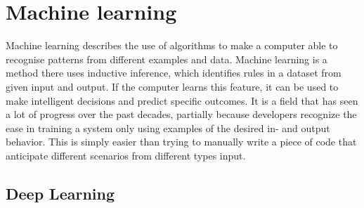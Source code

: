 \section{Machine learning}
Machine learning describes the use of algorithms to make a computer able to recognise patterns from different examples and data. Machine learning is a method there uses inductive inference, which identifies rules in a dataset from given input and output. If the computer learns this feature, it can be used to make intelligent decisions and predict specific outcomes.\citep{Nielsen2010}
It is a field that has seen a lot of progress over the past decades, partially because developers recognize the ease in training a system only using examples of the desired in- and output behavior. This is simply easier than trying to manually write a piece of code that anticipate different scenarios from different types input.\citep{Jordan2015}


\subsection{Deep Learning}
